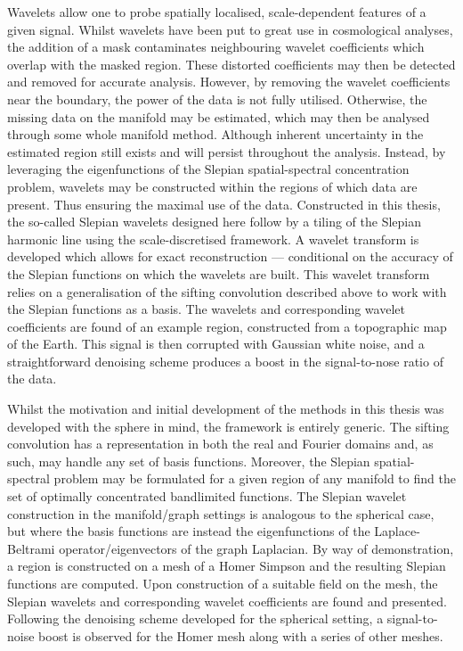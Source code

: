 Wavelets allow one to probe spatially localised, scale-dependent features of a given signal.
Whilst wavelets have been put to great use in cosmological analyses, the addition of a mask contaminates neighbouring wavelet coefficients which overlap with the masked region.
These distorted coefficients may then be detected and removed for accurate analysis.
However, by removing the wavelet coefficients near the boundary, the power of the data is not fully utilised.
Otherwise, the missing data on the manifold may be estimated, which may then be analysed through some whole manifold method.
Although inherent uncertainty in the estimated region still exists and will persist throughout the analysis.
Instead, by leveraging the eigenfunctions of the Slepian spatial-spectral concentration problem, wavelets may be constructed within the regions of which data are present.
Thus ensuring the maximal use of the data.
Constructed in this thesis, the so-called Slepian wavelets designed here follow by a tiling of the Slepian harmonic line using the scale-discretised framework.
A wavelet transform is developed which allows for exact reconstruction --- conditional on the accuracy of the Slepian functions on which the wavelets are built.
This wavelet transform relies on a generalisation of the sifting convolution described above to work with the Slepian functions as a basis.
The wavelets and corresponding wavelet coefficients are found of an example region, constructed from a topographic map of the Earth.
This signal is then corrupted with Gaussian white noise, and a straightforward denoising scheme produces a boost in the signal-to-nose ratio of the data.

Whilst the motivation and initial development of the methods in this thesis was developed with the sphere in mind, the framework is entirely generic.
The sifting convolution has a representation in both the real and Fourier domains and, as such, may handle any set of basis functions.
Moreover, the Slepian spatial-spectral problem may be formulated for a given region of any manifold to find the set of optimally concentrated bandlimited functions.
The Slepian wavelet construction in the manifold/graph settings is analogous to the spherical case, but where the basis functions are instead the eigenfunctions of the Laplace-Beltrami operator/eigenvectors of the graph Laplacian.
By way of demonstration, a region is constructed on a mesh of a Homer Simpson and the resulting Slepian functions are computed.
Upon construction of a suitable field on the mesh, the Slepian wavelets and corresponding wavelet coefficients are found and presented.
Following the denoising scheme developed for the spherical setting, a signal-to-noise boost is observed for the Homer mesh along with a series of other meshes.

